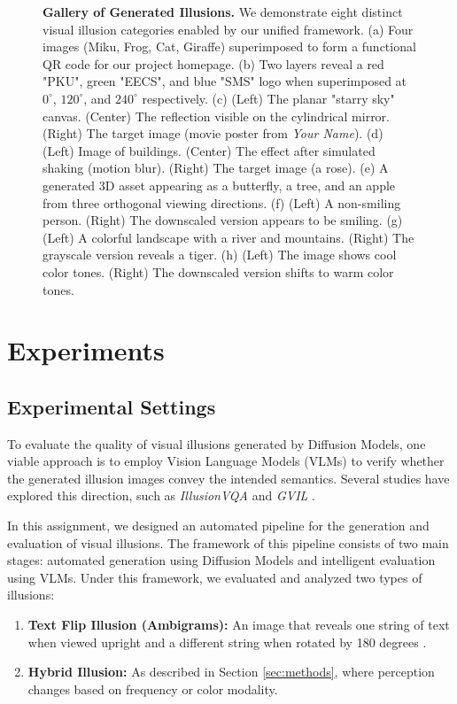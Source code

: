 \documentclass{article}
\begin{document}
\begin{figure}[t]
    \caption{\textbf{Gallery of Generated Illusions.} We demonstrate eight distinct visual illusion categories enabled by our unified framework. 
    (a) Four images (Miku, Frog, Cat, Giraffe) superimposed to form a functional QR code for our project homepage. 
    (b) Two layers reveal a red "PKU", green "EECS", and blue "SMS" logo when superimposed at $0^\circ$, $120^\circ$, and $240^\circ$ respectively. 
    (c) (Left) The planar "starry sky" canvas. (Center) The reflection visible on the cylindrical mirror. (Right) The target image (movie poster from \textit{Your Name}). 
    (d) (Left) Image of buildings. (Center) The effect after simulated shaking (motion blur). (Right) The target image (a rose). 
    (e) A generated 3D asset appearing as a butterfly, a tree, and an apple from three orthogonal viewing directions. 
    (f) (Left) A non-smiling person. (Right) The downscaled version appears to be smiling. 
    (g) (Left) A colorful landscape with a river and mountains. (Right) The grayscale version reveals a tiger. 
    (h) (Left) The image shows cool color tones. (Right) The downscaled version shifts to warm color tones.}
    \label{fig:all_methods}
\end{figure}

\section{Experiments}

\subsection{Experimental Settings}
To evaluate the quality of visual illusions generated by Diffusion Models, one viable approach is to employ Vision Language Models (VLMs) to verify whether the generated illusion images convey the intended semantics. Several studies have explored this direction, such as \emph{IllusionVQA} \cite{shahgir2024illusionvqa} and \emph{GVIL} \cite{zhang2023grounding}.

In this assignment, we designed an automated pipeline for the generation and evaluation of visual illusions. The framework of this pipeline consists of two main stages: automated generation using Diffusion Models and intelligent evaluation using VLMs. Under this framework, we evaluated and analyzed two types of illusions:
\begin{enumerate}
    \item \textbf{Text Flip Illusion (Ambigrams):} An image that reveals one string of text when viewed upright and a different string when rotated by 180 degrees \cite{geng2024visual}.
    \item \textbf{Hybrid Illusion:} As described in Section \ref{sec:methods}, where perception changes based on frequency or color modality.
\end{enumerate}
\end{document}
